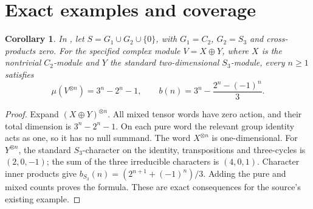 \documentclass[11pt]{article}
\newtheorem{corollary}[theorem]{Corollary}
\begin{document}
\section{Exact examples and coverage}
\begin{corollary}\label{cor:earlierexample}
In \cite[v1, Example~2.2, p.~3; v2, Example~1, p.~3]{HTgrowth}, let
\(S=G_1\cup G_2\cup\{0\}\), with \(G_1=C_2\), \(G_2=S_3\) and
cross-products zero. For the specified complex module \(V=X\oplus Y\),
where \(X\) is the nontrivial \(C_2\)-module and \(Y\) the standard
two-dimensional \(S_3\)-module, every \(n\geq1\) satisfies
\[
 \mu(V^{\otimes n})=3^n-2^n-1,\qquad
 b(n)=3^n-\frac{2^n-(-1)^n}{3}.
\]
\end{corollary}
\begin{proof}
Expand \((X\oplus Y)^{\otimes n}\). All mixed tensor words have zero action,
and their total dimension is \(3^n-2^n-1\). On each pure word the relevant
group identity acts as one, so it has no null summand. The word \(X^{\otimes n}\)
is one-dimensional. For \(Y^{\otimes n}\), the standard \(S_3\)-character on
the identity, transpositions and three-cycles is \((2,0,-1)\); the sum of the
three irreducible characters is \((4,0,1)\). Character inner products give
\(b_{S_3}(n)=(2^{n+1}+(-1)^n)/3\). Adding the pure and mixed counts proves
the formula. These are exact consequences for the source's existing example.
\end{proof}
\end{document}
